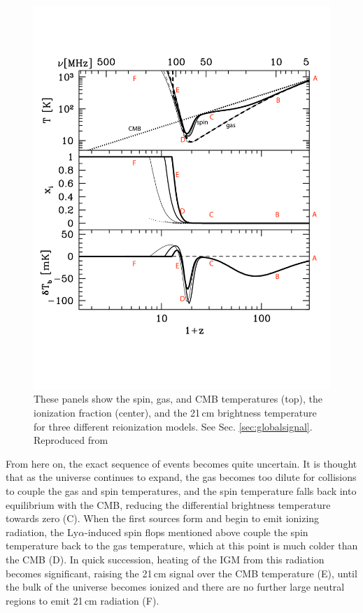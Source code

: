 \begin{figure}
	\centering
	\includegraphics[width=6in]{chap0_intro/pritchard_and_loeb_temperatures_annotated.pdf}
	\caption[The spin, gas, and CMB temperatures, the ionization fraction, and the 21\,cm brightness temperature for three different reionization models.]{These panels show the spin, gas, and CMB temperatures (top), the ionization fraction (center), and the 21\,cm brightness temperature for three different reionization models. See Sec. \ref{sec:globalsignal}. Reproduced from \citet{PritchardLoebReview}}
	\label{fig:pritchardloebtemperatures}
\end{figure}

From here on, the exact sequence of events becomes quite uncertain. It is thought that as the universe continues to expand, the gas becomes too dilute for collisions to couple the gas and spin temperatures, and the spin temperature falls back into equilibrium with the CMB, reducing the differential brightness temperature towards zero (C). When the first sources form and begin to emit ionizing radiation, the Ly$\alpha$-induced spin flops mentioned above couple the spin temperature back to the gas temperature, which at this point is much colder than the CMB (D). In quick succession, heating of the IGM from this radiation becomes significant, raising the 21\,cm signal over the CMB temperature (E), until the bulk of the universe becomes ionized and there are no further large neutral regions to emit 21\,cm radiation (F).

